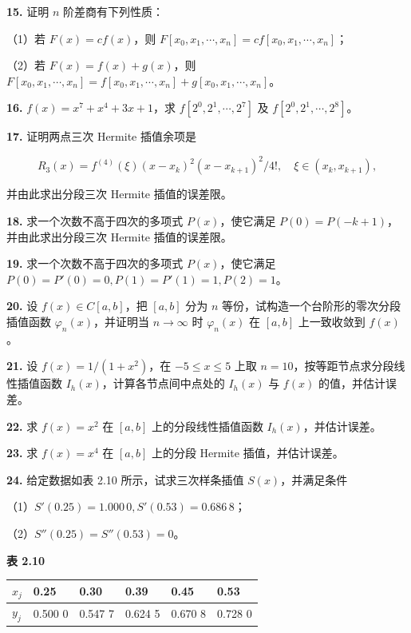 \textbf{15.} 证明 \(n\) 阶差商有下列性质：

（1）若 \(F(x)=cf(x)\)，则 \(F[x_0,x_1,\cdots,x_n]=cf[x_0,x_1,\cdots,x_n]\)；

（2）若 \(F(x)=f(x)+g(x)\)，则 \(F[x_0,x_1,\cdots,x_n]=f[x_0,x_1,\cdots,x_n]+g[x_0,x_1,\cdots,x_n]\)。

\textbf{16.} \(f(x)=x^7+x^4+3x+1\)，求 \(f[2^0,2^1,\cdots,2^7]\) 及 \(f[2^0,2^1,\cdots,2^8]\)。

\textbf{17.} 证明两点三次 Hermite 插值余项是

\[R_3(x)=f^{(4)}(\xi)(x-x_k)^2(x-x_{k+1})^2/4!,\quad\xi\in(x_k,x_{k+1}),\]

并由此求出分段三次 Hermite 插值的误差限。

\textbf{18.} 求一个次数不高于四次的多项式 \(P(x)\)，使它满足 \(P(0)=P(-k+1)\)，并由此求出分段三次 Hermite 插值的误差限。

\textbf{19.} 求一个次数不高于四次的多项式 \(P(x)\)，使它满足 \(P(0)=P'(0)=0,P(1)=P'(1)=1,P(2)=1\)。

\textbf{20.} 设 \(f(x)\in C[a,b]\)，把 \([a,b]\) 分为 \(n\) 等份，试构造一个台阶形的零次分段插值函数 \(\varphi_n(x)\)，并证明当 \(n\to\infty\) 时 \(\varphi_n(x)\) 在 \([a,b]\) 上一致收敛到 \(f(x)\)。

\textbf{21.} 设 \(f(x)=1/(1+x^2)\)，在 \(-5\leqslant x\leqslant5\) 上取 \(n=10\)，按等距节点求分段线性插值函数 \(I_h(x)\)，计算各节点间中点处的 \(I_h(x)\) 与 \(f(x)\) 的值，并估计误差。

\textbf{22.} 求 \(f(x)=x^2\) 在 \([a,b]\) 上的分段线性插值函数 \(I_h(x)\)，并估计误差。

\textbf{23.} 求 \(f(x)=x^4\) 在 \([a,b]\) 上的分段 Hermite 插值，并估计误差。

\textbf{24.} 给定数据如表 2.10 所示，试求三次样条插值 \(S(x)\)，并满足条件

（1）\(S'(0.25)=1.000\,0,S'(0.53)=0.686\,8\)；

（2）\(S''(0.25)=S''(0.53)=0\)。

\textbf{表 2.10}

{\def\LTcaptype{none} %
\begin{longtable}[]{@{}llllll@{}}
\toprule\noalign{}
\(x_j\) & 0.25 & 0.30 & 0.39 & 0.45 & 0.53 \\
\midrule\noalign{}
\endhead
\bottomrule\noalign{}
\endlastfoot
\(y_j\) & 0.500 0 & 0.547 7 & 0.624 5 & 0.670 8 & 0.728 0 \\
\end{longtable}
}

